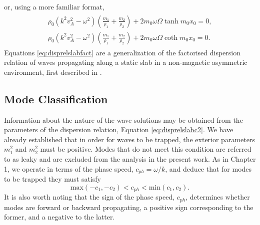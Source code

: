 %
or, using a more familiar format,
%
\begin{align}
\begin{split}
\label{eq:disprelslabfact}
\rho_0 (k^2 v_A^2 - \omega^2) \left( \frac{m_1}{\rho_1} + \frac{m_2}{\rho_2} \right)
+ 2 m_0 \omega \Omega \tanh m_0 x_0 = 0,
\\
\rho_0 (k^2 v_A^2 - \omega^2) \left( \frac{m_1}{\rho_1} + \frac{m_2}{\rho_2} \right)
+ 2 m_0 \omega \Omega \coth m_0 x_0 = 0.
\end{split}
\end{align}
%
Equations \eqref{eq:disprelslabfact} are a generalization of the factorised dispersion relation of waves propagating along a static slab in a non-magnetic asymmetric environment, first described in \cite{Allcock2017}.



\subsection{Mode Classification}
\label{subsec:modes}

Information about the nature of the wave solutions may be obtained from the parameters of the dispersion relation, Equation \eqref{eq:disprelslabc2}.
We have already established that in order for waves to be trapped, the exterior parameters $m_1^2$ and $m_2^2$ must be positive.
Modes that do not meet this condition are referred to as leaky and are excluded from the analysis in the present work.
As in Chapter 1, we operate in terms of the phase speed, $c_{ph} = \omega / k$, and deduce that for modes to be trapped they must satisfy
%
\begin{equation}
\textrm{max}(-c_1, -c_2) < c_{ph} < \textrm{min}(c_1, c_2).
\end{equation}
%
It is also worth noting that the sign of the phase speed, $c_{ph}$, determines whether modes are forward or backward propagating, a positive sign corresponding to the former, and a negative to the latter.

